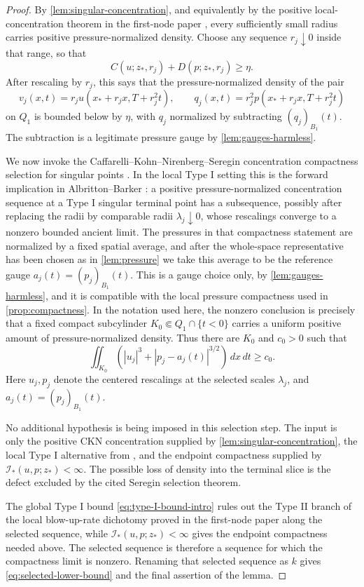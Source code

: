 \documentclass[11pt]{amsart}
\theoremstyle{plain}
\theoremstyle{definition}
\theoremstyle{remark}
\numberwithin{equation}{section}
\newcommand{\calI}{\mathcal I}
\begin{document}
\begin{proof}
By \cref{lem:singular-concentration}, and equivalently by the positive
local-concentration theorem in the first-node paper
\cite[Theorem \texttt{thm:singular-positive}]
{Paper0LocalConcentration}, every sufficiently small radius carries positive
pressure-normalized density.  Choose any sequence \(r_j\downarrow0\) inside
that range, so that
\[
   C(u;z_*,r_j)+D(p;z_*,r_j)\ge \eta .
\]
After rescaling by \(r_j\), this says that the pressure-normalized density of
the pair
\[
   v_j(x,t)=r_j u(x_*+r_jx,T+r_j^2t),\qquad
   q_j(x,t)=r_j^2p(x_*+r_jx,T+r_j^2t)
\]
on \(Q_1\) is bounded below by \(\eta\), with \(q_j\) normalized by subtracting
\((q_j)_{B_1}(t)\).  The subtraction is a legitimate pressure gauge by
\cref{lem:gauges-harmless}.

We now invoke the Caffarelli--Kohn--Nirenberg--Seregin concentration
compactness selection for singular points
\cite{CKN1982,Lin1998,Seregin2012}.  In the local Type I setting this is the
forward implication in Albritton--Barker
\cite[Theorem 1.1]{AlbrittonBarker2019}: a positive
pressure-normalized concentration sequence at a Type I singular terminal point
has a subsequence, possibly after replacing the radii by comparable radii
\(\lambda_j\downarrow0\), whose rescalings converge to a nonzero bounded
ancient limit.  The pressures in that compactness statement are normalized by
a fixed spatial average, and after the whole-space representative has been
chosen as in \cref{lem:pressure} we take this average to be the reference
gauge \(a_j(t)=(p_j)_{B_1}(t)\).  This is a gauge choice only, by
\cref{lem:gauges-harmless}, and it is compatible with the local pressure
compactness used in \cref{prop:compactness}.  In the notation used here, the
nonzero conclusion is precisely that a fixed compact subcylinder
\(K_0\Subset Q_1\cap\{t<0\}\) carries a uniform positive amount of
pressure-normalized density.  Thus there are \(K_0\) and \(c_0>0\) such that
\[
   \iint_{K_0}
   \left(|u_j|^3+|p_j-a_j(t)|^{3/2}\right)\,dx\,dt\ge c_0 .
\]
Here \(u_j,p_j\) denote the centered rescalings at the selected scales
\(\lambda_j\), and \(a_j(t)=(p_j)_{B_1}(t)\).

No additional hypothesis is being imposed in this selection step.  The input is
only the positive CKN concentration supplied by
\cref{lem:singular-concentration}, the local Type I alternative from
\cite[Theorem \texttt{thm:blowup-rate-dichotomy}]
{Paper0LocalConcentration}, and the endpoint compactness supplied by
\(\calI_*(u,p;z_*)<\infty\).  The possible loss of density into the terminal
slice is the defect excluded by the cited Seregin selection theorem.

The global Type I bound \eqref{eq:type-I-bound-intro} rules out the Type II
branch of the local blow-up-rate dichotomy proved in the first-node paper
\cite[Theorem \texttt{thm:blowup-rate-dichotomy}]
{Paper0LocalConcentration} along the selected sequence, while
\(\calI_*(u,p;z_*)<\infty\) gives the endpoint compactness needed above.
The selected sequence is therefore a sequence for which the compactness limit
is nonzero.  Renaming that selected sequence as \(k\) gives
\eqref{eq:selected-lower-bound} and the final assertion of the lemma.
\end{proof}
\end{document}
